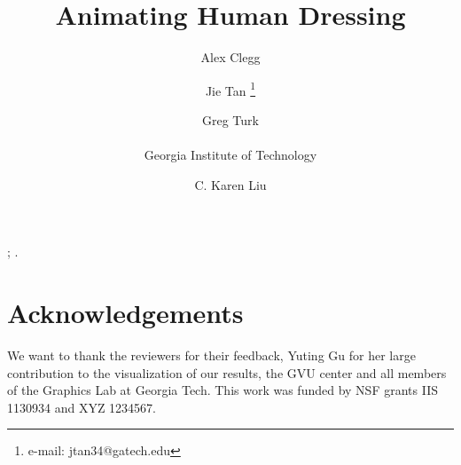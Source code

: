 \documentclass[review]{acmsiggraph}
\title{Animating Human Dressing}
\author{Alex Clegg \and Jie Tan \thanks{e-mail: jtan34@gatech.edu} %
\and Greg Turk \\ \\ Georgia Institute of Technology %
\and C. Karen Liu}
\begin{document}


\maketitle


\begin{abstract}

\end{abstract}

\begin{CRcatlist}
  ;
  .
\end{CRcatlist}

\keywordlist
\copyrightspace










\section*{Acknowledgements}

We want to thank the reviewers for their feedback, Yuting Gu
for her large contribution to the visualization of our results, the GVU center and all members of the Graphics Lab at Georgia Tech. This work was funded by NSF grants IIS 1130934 and XYZ 1234567.




%
\end{document}

